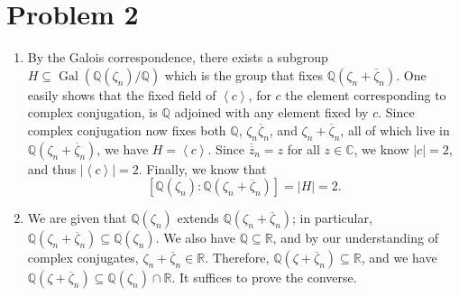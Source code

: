 \documentclass[11pt, letterpaper]{article}
\begin{document}
\section*{Problem 2}
\begin{enumerate}
	\item By the Galois correspondence, there exists a subgroup $H\subseteq \operatorname{Gal} (\mathbb{Q} (\zeta _n) /\mathbb{Q} )$ which is the group that fixes $\mathbb{Q} (\zeta _n+\overline{\zeta } _n)$. One easily shows that the fixed field of $\left\langle c \right\rangle $, for $c$ the element corresponding to complex conjugation, is $\mathbb{Q} $ adjoined with any element fixed by $c$. Since complex conjugation now fixes both $\mathbb{Q} $, $\zeta _n \overline{\zeta } _n$, and $\zeta_n+\overline{\zeta } _n$, all of which live in $\mathbb{Q} (\zeta _n+\overline{\zeta } _n)$, we have $H=\left\langle c \right\rangle $. Since $\overline{\overline{z} } _n=z$ for all $z\in\mathbb{C} $, we know $\left| c \right| =2$, and thus $\left| \left\langle c \right\rangle  \right| =2$. Finally, we know that
		\[
			\left[ \mathbb{Q} (\zeta_n ):\mathbb{Q} (\zeta _n+\overline{\zeta } _n) \right] =\left| H \right| =2
		.\]
	\item We are given that $\mathbb{Q} (\zeta _n)$ extends $\mathbb{Q}(\zeta _n+ \overline{\zeta } _n)$; in particular, $\mathbb{Q} (\zeta _n + \overline{\zeta } _n)\subseteq \mathbb{Q} (\zeta _n)$. We also have $\mathbb{Q} \subseteq \mathbb{R} $, and by our understanding of complex conjugates, $\zeta_n+\overline{\zeta } _n\in\mathbb{R} $. Therefore, $\mathbb{Q} (\zeta +\overline{\zeta } _n)\subseteq \mathbb{R} $, and we have $\mathbb{Q} (\zeta +\overline{\zeta } _n)\subseteq \mathbb{Q} (\zeta _n)\cap \mathbb{R} $. It suffices to prove the converse.


\end{enumerate}
\end{document}
